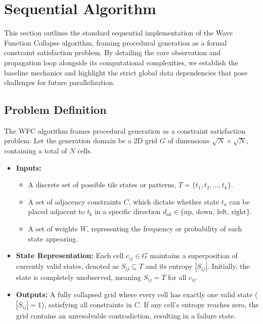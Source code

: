 \section{Sequential Algorithm}

This section outlines the standard sequential implementation of the Wave Function Collapse algorithm, framing procedural generation as a formal constraint satisfaction problem. By detailing the core observation and propagation loop alongside its computational complexities, we establish the baseline mechanics and highlight the strict global data dependencies that pose challenges for future parallelization.

\subsection{Problem Definition}

The WFC algorithm frames procedural generation as a constraint satisfaction problem. Let the generation domain be a 2D grid $G$ of dimensions $\sqrt{N} \times \sqrt{N}$, containing a total of $N$ cells. 

\begin{itemize}
    \item \textbf{Inputs:} 
    \begin{itemize}
        \item A discrete set of possible tile states or patterns, $T = \{t_1, t_2, \dots, t_k\}$.
        \item A set of adjacency constraints $C$, which dictate whether state $t_a$ can be placed adjacent to $t_b$ in a specific direction $d_{ab} \in \{\text{up, down, left, right}\}$.
        \item A set of weights $W$, representing the frequency or probability of each state appearing.
    \end{itemize}
    
    \item \textbf{State Representation:} Each cell $c_{ij} \in G$ maintains a superposition of currently valid states, denoted as $S_{ij} \subseteq T$ and its entropy $|S_{ij}|$. Initially, the state is completely unobserved, meaning $S_{ij} = T$ for all $c_{ij}$.
    
    \item \textbf{Outputs:} A fully collapsed grid where every cell has exactly one valid state ($|S_{ij}| = 1$), satisfying all constraints in $C$. If any cell's entropy reaches zero, the grid contains an unresolvable contradiction, resulting in a failure state.
\end{itemize}

